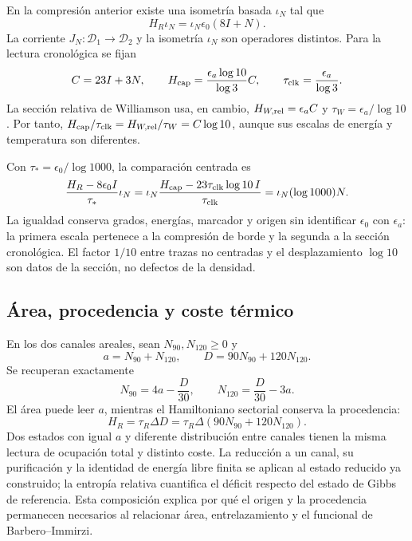 En la compresión anterior existe una isometría basada $\iota_N$ tal que
\[
 H_R\iota_N=\iota_N\epsilon_0(8I+N).
\]
La corriente $J_N:\mathcal D_1\to\mathcal D_2$ y la isometría
$\iota_N$ son operadores distintos. Para la lectura cronológica se fijan
\begin{equation}
 C=23I+3N,\qquad
 H_{\rm cap}=\frac{\epsilon_a\log10}{\log3}C,
 \qquad \tau_{\rm clk}=\frac{\epsilon_a}{\log3}.
 \label{v:eq:lector-capacidad-escalas}
\end{equation}
La sección relativa de Williamson usa, en cambio,
$H_{W,{\rm rel}}=\epsilon_a C$ y
$\tau_W=\epsilon_a/\log10$. Por tanto,
$H_{\rm cap}/\tau_{\rm clk}=H_{W,{\rm rel}}/\tau_W=C\log10$,
aunque sus escalas de energía y temperatura son diferentes.

Con $\tau_*=\epsilon_0/\log1000$, la comparación centrada es
\begin{equation}
 \frac{H_R-8\epsilon_0I}{\tau_*}\iota_N
 =\iota_N\frac{H_{\rm cap}-23\tau_{\rm clk}\log10\,I}
                    {\tau_{\rm clk}}
 =\iota_N(\log1000)N.
 \label{v:eq:transporte-termico-centrado}
\end{equation}
La igualdad conserva grados, energías, marcador y origen sin identificar
$\epsilon_0$ con $\epsilon_a$: la primera escala pertenece a la compresión
de borde y la segunda a la sección cronológica. El factor $1/10$ entre
trazas no centradas y el desplazamiento $\log10$ son datos de la sección,
no defectos de la densidad.

\subsection{Área, procedencia y coste térmico}

En los dos canales areales, sean $N_{90},N_{120}\ge0$ y
\begin{equation}
 a=N_{90}+N_{120},\qquad
 D=90N_{90}+120N_{120}.
 \label{v:eq:ocupacion-procedencia-90-120}
\end{equation}
Se recuperan exactamente
\begin{equation}
 N_{90}=4a-\frac D{30},\qquad
 N_{120}=\frac D{30}-3a.
 \label{v:eq:inversion-procedencia-90-120}
\end{equation}
El área puede leer $a$, mientras el Hamiltoniano sectorial conserva la
procedencia:
\begin{equation}
 H_R=\tau_R\Delta D
 =\tau_R\Delta(90N_{90}+120N_{120}).
 \label{v:eq:hamiltoniano-area-procedencia}
\end{equation}
Dos estados con igual $a$ y diferente distribución entre canales tienen la
misma lectura de ocupación total y distinto coste. La reducción a un canal,
su purificación y la identidad de energía libre finita se aplican al estado
reducido ya construido; la entropía relativa cuantifica el déficit respecto
del estado de Gibbs de referencia. Esta composición explica por qué el
origen y la procedencia permanecen necesarios al relacionar área,
entrelazamiento y el funcional de Barbero--Immirzi.


